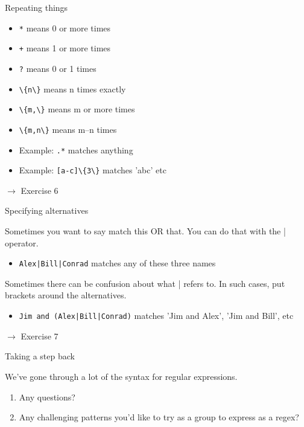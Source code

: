 \documentclass{beamer}
\begin{document}
\begin{frame}{Repeating things}

\begin{itemize}
 \item \lstinline$*$ means 0 or more times
 \item \lstinline$+$ means 1 or more times
 \item \lstinline$?$ means 0 or 1 times
 \item \lstinline$\{n\}$ means n times exactly
 \item \lstinline$\{m,\}$ means m or more times
 \item \lstinline$\{m,n\}$ means m--n times
 \item Example: \lstinline$.*$ matches anything
 \item Example: \lstinline$[a-c]\{3\}$ matches 'abc' etc
\end{itemize}

\bigskip
$\rightarrow$ Exercise 6

\end{frame}

\begin{frame}{Specifying alternatives}

Sometimes you want to say match this OR that.
You can do that with the | operator.

\begin{itemize}
  \item \lstinline$Alex|Bill|Conrad$ matches any of these three names
\end{itemize}

Sometimes there can be confusion about what | refers to.
In such cases, put brackets around the alternatives.

\begin{itemize}
  \item \lstinline$Jim and (Alex|Bill|Conrad)$ matches 'Jim and Alex', 'Jim and Bill', etc
\end{itemize}

\bigskip
$\rightarrow$ Exercise 7

\end{frame}

\begin{frame}{Taking a step back}

We've gone through a lot of the syntax for regular expressions.

\begin{enumerate}
  \item Any questions?
  \item Any challenging patterns you'd like to try as a group to express as a regex?
\end{enumerate}
\end{frame}
\end{document}
